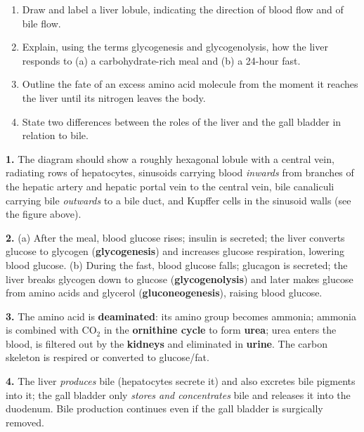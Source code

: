 \documentclass[11pt]{article}
\begin{document}
\begin{exercice}[Consolidation]
\begin{enumerate}
\item Draw and label a liver lobule, indicating the direction of blood flow and of bile flow.
\item Explain, using the terms glycogenesis and glycogenolysis, how the liver responds to (a) a carbohydrate-rich meal and (b) a 24-hour fast.
\item Outline the fate of an excess amino acid molecule from the moment it reaches the liver until its nitrogen leaves the body.
\item State two differences between the roles of the liver and the gall bladder in relation to bile.
\end{enumerate}
\end{exercice}

\begin{corrige}[Exercise 1]
\textbf{1.} The diagram should show a roughly hexagonal lobule with a central vein, radiating rows of hepatocytes, sinusoids carrying blood \emph{inwards} from branches of the hepatic artery and hepatic portal vein to the central vein, bile canaliculi carrying bile \emph{outwards} to a bile duct, and Kupffer cells in the sinusoid walls (see the figure above).
\par\textbf{2.} (a) After the meal, blood glucose rises; insulin is secreted; the liver converts glucose to glycogen (\textbf{glycogenesis}) and increases glucose respiration, lowering blood glucose. (b) During the fast, blood glucose falls; glucagon is secreted; the liver breaks glycogen down to glucose (\textbf{glycogenolysis}) and later makes glucose from amino acids and glycerol (\textbf{gluconeogenesis}), raising blood glucose.
\par\textbf{3.} The amino acid is \textbf{deaminated}: its amino group becomes ammonia; ammonia is combined with $\mathrm{CO_2}$ in the \textbf{ornithine cycle} to form \textbf{urea}; urea enters the blood, is filtered out by the \textbf{kidneys} and eliminated in \textbf{urine}. The carbon skeleton is respired or converted to glucose/fat.
\par\textbf{4.} The liver \emph{produces} bile (hepatocytes secrete it) and also excretes bile pigments into it; the gall bladder only \emph{stores and concentrates} bile and releases it into the duodenum. Bile production continues even if the gall bladder is surgically removed.
\end{corrige}
\end{document}
